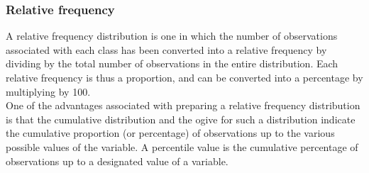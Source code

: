 \documentclass{beamer}
\begin{document}
\begin{frame}
\frametitle{Relative frequency}
A relative frequency distribution is one in which the number of observations associated with each class has
been converted into a relative frequency by dividing by the total number of observations in the entire
distribution. Each relative frequency is thus a proportion, and can be converted into a percentage by multiplying
by 100.\\

\noindent One of the advantages associated with preparing a relative frequency distribution is that the cumulative
distribution and the ogive for such a distribution indicate the cumulative proportion (or percentage) of
observations up to the various possible values of the variable. A percentile value is the cumulative percentage of
observations up to a designated value of a variable.
\end{frame}
\end{document}
